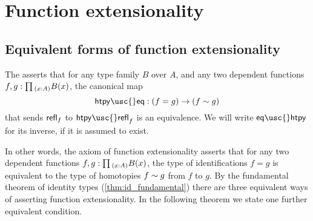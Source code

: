 \section{Function extensionality}
\label{chap:funext}

\subsection{Equivalent forms of function extensionality}
\begin{defn}
  The  asserts that for any type family $B$ over $A$, and any two dependent functions $f,g:\prd{x:A}B(x)$, the canonical map
  \begin{equation*}
    \mathsf{htpy\usc{}eq}:(f=g)\to (f\htpy g)
  \end{equation*}
  that sends $\mathsf{refl}_{f}$ to $\mathsf{htpy\usc{}refl}_{f}$ is an equivalence. We will write $\mathsf{eq\usc{}htpy}$ for its inverse, if it is assumed to exist.
\end{defn}

In other words, the axiom of function extensionality asserts that for any two dependent functions $f,g:\prd{x:A}B(x)$, the type of identifications $f=g$ is equivalent to the type of homotopies $f\sim g$ from $f$ to $g$. By the fundamental theorem of identity types (\cref{thm:id_fundamental}) there are three equivalent ways of asserting function extensionality. In the following theorem we state one further equivalent condition.

